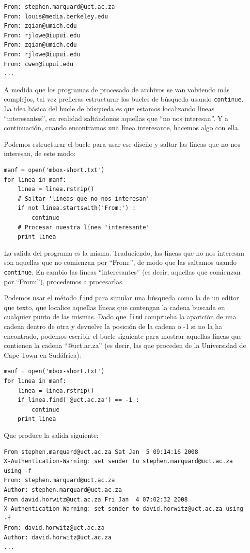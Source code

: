 \beforeverb
\begin{verbatim}
From: stephen.marquard@uct.ac.za
From: louis@media.berkeley.edu
From: zqian@umich.edu
From: rjlowe@iupui.edu
From: zqian@umich.edu
From: rjlowe@iupui.edu
From: cwen@iupui.edu
...
\end{verbatim}
\afterverb
%
A medida que los programas de procesado de archivos se van volviendo más complejos, tal vez
prefieras estructurar los bucles de búsqueda usando {\tt continue}. La idea básica
del bucle de búsqueda es que estamos localizando líneas ``interesantes'',
en realidad saltándonos aquellas que ``no nos interesan''. Y a continuación, cuando
encontramos una línea interesante, hacemos algo con ella.

Podemos estructurar el bucle para usar ese
diseño y saltar las líneas que no nos interesan, de este modo:

\beforeverb
\begin{verbatim}
manf = open('mbox-short.txt')
for linea in manf:
    linea = linea.rstrip()
    # Saltar 'líneas que no nos interesan'
    if not linea.startswith('From:') :
        continue
    # Procesar nuestra línea 'interesante'
    print linea
\end{verbatim}
\afterverb
%
La salida del programa es la misma. Traduciendo, las
líneas que no nos interesan son aquellas que no comienzan
por ``From:'', de modo que las saltamos usando {\tt continue}.
En cambio las líneas ``interesantes'' (es decir, aquellas que comienzan por ``From:''),
procedemos a procesarlas.

Podemos usar el método {\tt find} para simular una búsqueda como la de
un editor que texto, que localice aquellas líneas que contengan la cadena buscada
en cualquier punto de las mismas.
Dado que {\tt find} comprueba la aparición de una cadena dentro de otra
y devuelve la posición de la cadena o -1 si no la ha encontrado,
podemos escribir el bucle siguiente para mostrar aquellas líneas
que contienen la cadena ``@uct.ac.za'' (es decir, las que proceden de la Universidad
de Cape Town en Sudáfrica):

\beforeverb
\begin{verbatim}
manf = open('mbox-short.txt')
for linea in manf:
    linea = linea.rstrip()
    if linea.find('@uct.ac.za') == -1 : 
        continue
    print linea
\end{verbatim}
\afterverb
%
Que produce la salida siguiente:

\beforeverb
\begin{verbatim}
From stephen.marquard@uct.ac.za Sat Jan  5 09:14:16 2008
X-Authentication-Warning: set sender to stephen.marquard@uct.ac.za using -f
From: stephen.marquard@uct.ac.za
Author: stephen.marquard@uct.ac.za
From david.horwitz@uct.ac.za Fri Jan  4 07:02:32 2008
X-Authentication-Warning: set sender to david.horwitz@uct.ac.za using -f
From: david.horwitz@uct.ac.za
Author: david.horwitz@uct.ac.za
...
\end{verbatim}
\afterverb
%

